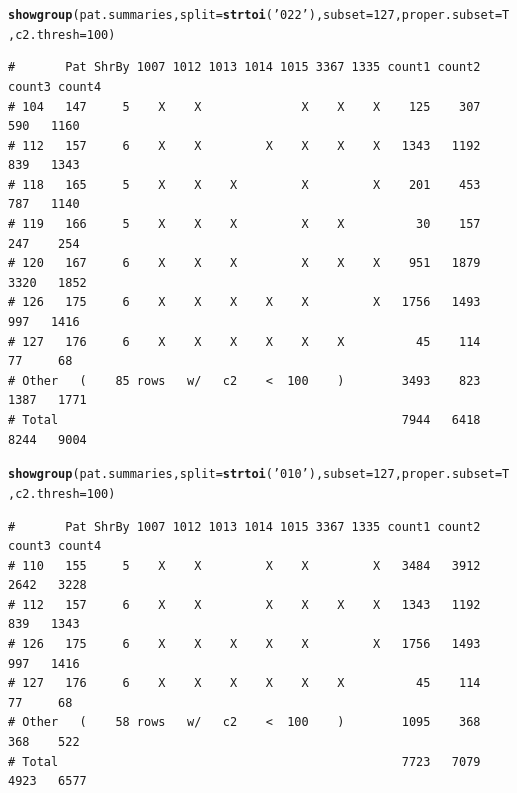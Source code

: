 \documentclass{article}\usepackage[]{graphicx}\usepackage[]{color}
\makeatletter
\newcommand{\hlnum}[1]{\textcolor[rgb]{0.686,0.059,0.569}{#1}}%
\newcommand{\hlstr}[1]{\textcolor[rgb]{0.192,0.494,0.8}{#1}}%
\newcommand{\hlstd}[1]{\textcolor[rgb]{0.345,0.345,0.345}{#1}}%
\newcommand{\hlkwc}[1]{\textcolor[rgb]{0.333,0.667,0.333}{#1}}%
\newcommand{\hlkwd}[1]{\textcolor[rgb]{0.737,0.353,0.396}{\textbf{#1}}}%
\newenvironment{kframe}{%
 \def\at@end@of@kframe{}%
 \ifinner\ifhmode%
  \def\at@end@of@kframe{\end{minipage}}%
  \begin{minipage}{\columnwidth}%
 \fi\fi%
 \def\FrameCommand##1{\hskip\@totalleftmargin \hskip-\fboxsep
 \colorbox{shadecolor}{##1}\hskip-\fboxsep
     \hskip-\linewidth \hskip-\@totalleftmargin \hskip\columnwidth}%
 \MakeFramed {\advance\hsize-\width
   \@totalleftmargin\z@ \linewidth\hsize
   \@setminipage}}%
 {\par\unskip\endMakeFramed%
 \at@end@of@kframe}
\newenvironment{knitrout}{}{} %
\makeatother
\begin{document}
\begin{knitrout}\footnotesize
{}\color{fgcolor}\begin{kframe}
\begin{alltt}
\hlkwd{showgroup}\hlstd{(pat.summaries,}\hlkwc{split}\hlstd{=}\hlkwd{strtoi}\hlstd{(}\hlstr{'022'}\hlstd{),} \hlkwc{subset}\hlstd{=}\hlnum{127}\hlstd{,} \hlkwc{proper.subset}\hlstd{=T,} \hlkwc{c2.thresh}\hlstd{=}\hlnum{100}\hlstd{)}
\end{alltt}
\begin{verbatim}
#       Pat ShrBy 1007 1012 1013 1014 1015 3367 1335 count1 count2 count3 count4
# 104   147     5    X    X              X    X    X    125    307    590   1160
# 112   157     6    X    X         X    X    X    X   1343   1192    839   1343
# 118   165     5    X    X    X         X         X    201    453    787   1140
# 119   166     5    X    X    X         X    X          30    157    247    254
# 120   167     6    X    X    X         X    X    X    951   1879   3320   1852
# 126   175     6    X    X    X    X    X         X   1756   1493    997   1416
# 127   176     6    X    X    X    X    X    X          45    114     77     68
# Other   (    85 rows   w/   c2    <  100    )        3493    823   1387   1771
# Total                                                7944   6418   8244   9004
\end{verbatim}
\begin{alltt}
\hlkwd{showgroup}\hlstd{(pat.summaries,}\hlkwc{split}\hlstd{=}\hlkwd{strtoi}\hlstd{(}\hlstr{'010'}\hlstd{),} \hlkwc{subset}\hlstd{=}\hlnum{127}\hlstd{,} \hlkwc{proper.subset}\hlstd{=T,} \hlkwc{c2.thresh}\hlstd{=}\hlnum{100}\hlstd{)}
\end{alltt}
\begin{verbatim}
#       Pat ShrBy 1007 1012 1013 1014 1015 3367 1335 count1 count2 count3 count4
# 110   155     5    X    X         X    X         X   3484   3912   2642   3228
# 112   157     6    X    X         X    X    X    X   1343   1192    839   1343
# 126   175     6    X    X    X    X    X         X   1756   1493    997   1416
# 127   176     6    X    X    X    X    X    X          45    114     77     68
# Other   (    58 rows   w/   c2    <  100    )        1095    368    368    522
# Total                                                7723   7079   4923   6577
\end{verbatim}
\end{kframe}
\end{knitrout}
\end{document}
